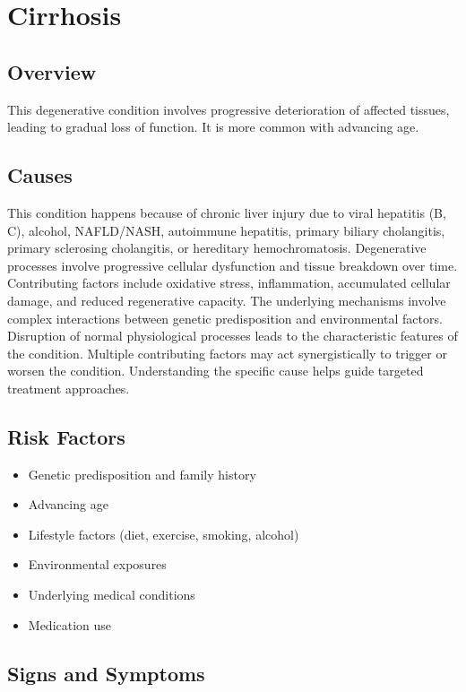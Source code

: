 \chapter{Cirrhosis}
\label{sec:Cirrhosis}

\section{Overview}
This degenerative condition involves progressive deterioration of affected tissues, leading to gradual loss of function. It is more common with advancing age.
\section{Causes}
This condition happens because of chronic liver injury due to viral hepatitis (B, C), alcohol, NAFLD/NASH, autoimmune hepatitis, primary biliary cholangitis, primary sclerosing cholangitis, or hereditary hemochromatosis. Degenerative processes involve progressive cellular dysfunction and tissue breakdown over time. Contributing factors include oxidative stress, inflammation, accumulated cellular damage, and reduced regenerative capacity. The underlying mechanisms involve complex interactions between genetic predisposition and environmental factors. Disruption of normal physiological processes leads to the characteristic features of the condition. Multiple contributing factors may act synergistically to trigger or worsen the condition. Understanding the specific cause helps guide targeted treatment approaches.
\section{Risk Factors}


\begin{itemize}[noitemsep]
  \item Genetic predisposition and family history
  \item Advancing age
  \item Lifestyle factors (diet, exercise, smoking, alcohol)
  \item Environmental exposures
  \item Underlying medical conditions
  \item Medication use
\end{itemize}
\section{Signs and Symptoms}

